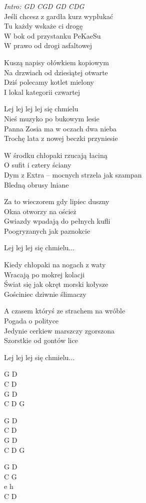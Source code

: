 \begin{text}
    \textit{Intro: GD CGD GD CDG}\\
    Jeśli chcesz z gardła kurz wypłukać\\
    Tu każdy wskaże ci drogę\\
    W bok od przystanku PeKaeSu\\
    W prawo od drogi asfaltowej
    
    Kuszą napisy ołówkiem kopiowym\\
    Na drzwiach od dziesiątej otwarte\\
    Dziś polecamy kotlet mielony\\
    I lokal kategorii czwartej

    \vin Lej lej lej lej się chmielu\\
    \vin Nieś muzyko po bukowym lesie\\
    \vin Panna Zosia ma w oczach dwa nieba\\
    \vin Trochę lata z nowej beczki przyniesie

    W środku chłopaki rzucają łaciną\\
    O sufit i cztery ściany\\
    Dym z Extra – mocnych strzela jak szampan\\
    Bledną obrusy lniane
    
    Za to wieczorem gdy lipiec duszny\\
    Okna otworzy na oścież\\
    Gwiazdy wpadają do pełnych kufli\\
    Poogryzanych jak paznokcie
    
    \vin Lej lej lej się chmielu...
    
    Kiedy chłopaki na nogach z waty\\
    Wracają po mokrej kolacji\\
    Świat się jak okręt morski kołysze\\
    Gościniec dziwnie ślimaczy
    
    A czasem któryś ze strachem na wróble\\
    Pogada o polityce\\
    Jedynie cerkiew marszczy zgorszona\\
    Szorstkie od gontów lice
    
    \vin Lej lej lej się chmielu...
\end{text}
\begin{chord}
    \hfill\break
    G D\\
    C D\\
    G D\\
    C D G

    G D\\
    C D\\
    G D\\
    C D G

    G D\\
    C G\\
    e h\\
    C D
\end{chord}
